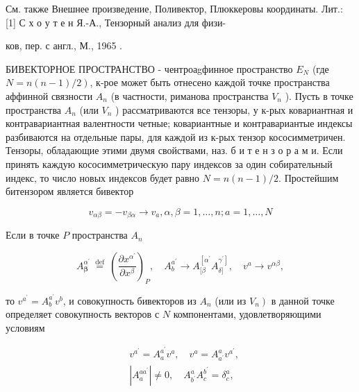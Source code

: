 \documentclass[10pt]{article}
\begin{document}
См. также Внешнее произведение, Поливектор, Плюккеровы координаты. Лит.: [1] С х о у т е н Я.-А., Тензорный анализ для физи-

ков, пер. с англ., М., 1965 .



БИВЕКТОРНОЕ ПРОСТРАНСТВО - чентроаgфинное пространство $E_{N}$ (где $\left.N=n(n-1) / 2\right)$, к-рое может быть отнесено каждой точке пространства аффинной связности $A_{n}$ (в частности, риманова пространства $V_{n}$ ). Пусть в точке пространства $A_{n}$ (или $V_{n}$ ) рассматриваются все тензоры, у к-рых ковариантная и контравариантная валентности четные; ковариантные и контравариантые индексы разбиваются на отдельные пары, для каждой из к-рых тензор кососимметричен. Тензоры, обладающие этими двумя свойствами, наз. б и т е н з о р а м и. Если принять каждую кососимметрическую пару индексов за один собирательный индекс, то число новых индексов будет равно $N=n(n-1) / 2$. Простейшим битензором является бивектор



\[

v_{\alpha \beta}=-v_{\beta \alpha} \longrightarrow v_{a}, \alpha, \beta=1, \ldots, n ; a=1, \ldots, N

\]



Если в точке $P$ пространства $A_{n}$



\[

A_{\boldsymbol{\beta}}^{\alpha^{\prime}} \stackrel{\text { def }}{=}\left(\frac{\partial x^{\alpha^{\prime}}}{\partial x^{\beta}}\right)_{P}, \quad A_{b}^{a^{\prime}} \longrightarrow A_{[\beta}^{\left[\alpha^{\prime}\right.} A_{\delta]}^{\left.\gamma^{\prime}\right]}, \quad v^{a} \longrightarrow v^{\alpha \beta},

\]



то $v^{a^{\prime}}=A_{b}^{a^{\prime}} v^{b}$, и совокупность бивекторов из $A_{n}$ (или из $\left.V_{n}\right)$ в данной точке определяет совокупность векторов с $N$ компонентами, удовлетворяющими условиям



\[

\begin{aligned}

& v^{a^{\prime}}=A_{a}^{a^{\prime}} v^{a}, \quad v^{a}=A_{a^{\prime}}^{a} v^{a^{\prime}}, \\

& \left|A_{a}^{a a^{\prime}}\right| \neq 0, \quad A_{b^{\prime}}^{a} A_{c}^{b^{\prime}}=\delta_{c}^{a},

\end{aligned}

\]
\end{document}
